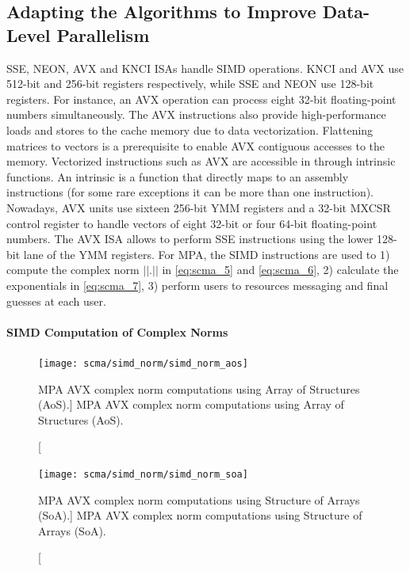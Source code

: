 \subsection{Adapting the Algorithms to Improve Data-Level Parallelism}
\label{sec:opt_scma_adapting_algorithms}

SSE, NEON, AVX and KNCI ISAs handle SIMD operations. KNCI and AVX use 512-bit
and 256-bit registers respectively, while SSE and NEON use 128-bit registers.
For instance, an AVX operation can process eight 32-bit floating-point numbers
simultaneously. The AVX instructions also provide high-performance loads and
stores to the cache memory due to data vectorization. Flattening matrices to
vectors is a prerequisite to enable AVX contiguous accesses to the memory.
Vectorized instructions such as AVX are accessible in \Cxx through intrinsic
functions. An intrinsic is a function that directly maps to an assembly
instructions (for some rare exceptions it can be more than one instruction).
Nowadays, AVX units use sixteen 256-bit YMM registers and a 32-bit MXCSR control
register to handle vectors of eight 32-bit or four 64-bit floating-point
numbers. The AVX ISA allows to perform SSE instructions using the lower 128-bit
lane of the YMM registers. For MPA, the SIMD instructions are used to 1) compute
the complex norm $||.||$ in \eqref{eq:scma_5} and \eqref{eq:scma_6},
2) calculate the exponentials in \eqref{eq:scma_7}, 3) perform users to
resources messaging and final guesses at each user.

\paragraph{SIMD Computation of Complex Norms}

\begin{figure}[htp]
  \centering
  \texttt{[image: scma/simd\_norm/simd\_norm\_aos]}
  \caption
    [MPA AVX complex norm computations using Array of Structures (AoS).]
    {MPA AVX complex norm computations using Array of Structures (AoS).}
  \label{fig:scma_simd_norm_aos}
\end{figure}

\begin{figure}[htp]
  \centering
  \texttt{[image: scma/simd\_norm/simd\_norm\_soa]}
  \caption
    [MPA AVX complex norm computations using Structure of Arrays (SoA).]
    {MPA AVX complex norm computations using Structure of Arrays (SoA).}
  \label{fig:scma_simd_norm_soa}
\end{figure}


